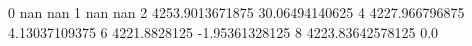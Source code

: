 0 nan nan
1 nan nan
2 4253.9013671875 30.06494140625
4 4227.966796875 4.13037109375
6 4221.8828125 -1.95361328125
8 4223.83642578125 0.0
